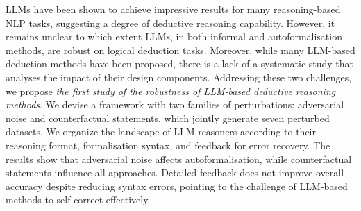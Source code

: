 \acp{LLM} have been shown to achieve impressive results for many reasoning-based \ac{NLP} tasks, suggesting a degree of deductive reasoning capability. However, 
it remains unclear to which extent LLMs, in both informal and autoformalisation methods, are robust on logical deduction tasks.
Moreover, while many LLM-based deduction methods have been proposed, there is a lack of a systematic study that analyses the impact of their design components.
Addressing these two challenges, we propose \textit{the first study of the robustness of LLM-based deductive reasoning methods}. We devise a framework with two families of perturbations: adversarial noise and counterfactual statements, which jointly generate seven perturbed datasets. We organize the landscape of LLM reasoners according to their reasoning format, formalisation syntax, and feedback for error recovery. The results show that adversarial noise affects autoformalisation, while counterfactual statements influence all approaches. Detailed feedback does not improve overall accuracy despite reducing syntax errors, pointing to the challenge of LLM-based methods to self-correct effectively. 

